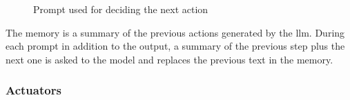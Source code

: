 \begin{figure}
\centering
{}
\caption{Prompt used for deciding the next action}
\end{figure}

The memory is a summary of the previous actions generated by the llm.
During each prompt in addition to the output, a summary of the previous
step plus the next one is asked to the model and replaces the previous
text in the memory.

\subsubsection{Actuators}\label{actuators}

